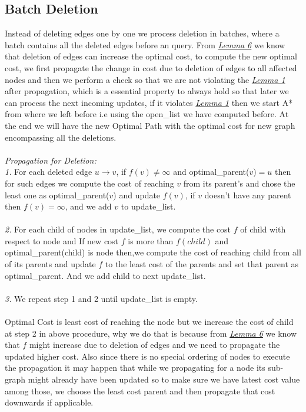 \documentclass[a4paper]{article}
\begin{document}
\subsection{Batch Deletion}
Instead of deleting edges one by one we process deletion in batches, where a batch contains all the deleted edges before an query. From \hyperlink{Lemma 6}{\textit{Lemma 6}} we know that deletion of edges can increase the optimal cost, to compute the new optimal cost, we first propagate the change in cost due to deletion of edges to all affected nodes and then we perform a check so that we  are not violating the \hyperlink{Lemma 1}{\textit{Lemma 1}} after propagation, which is a essential property to always hold so that later we can process the next incoming updates, if it violates \hyperlink{Lemma 1}{\textit{Lemma 1}} then we start A* from where we left before i.e using the open\_list we have computed before. At the end we will have the new Optimal Path with the optimal cost for new graph encompassing all the deletions.\\
\\
\textit{Propagation for Deletion:}\\
\textit{1.} For each deleted edge $u \rightarrow v$, if $f(v) \neq \infty$ and optimal\_parent($v$)$=u$ then for such edges we compute the cost of reaching $v$ from its parent's and chose the least one as optimal\_parent($v$) and update $f(v)$, if $v$ doesn't have any parent then $f(v)=\infty$, and we add $v$ to update\_list.\\
\\\textit{2.} For each child of nodes in update\_list, we compute the cost $f$ of child with respect to node and If new cost $f$ is more than $f(child)$ and optimal\_parent(child)  is node
     then,we compute the cost of reaching child from all of its parents and update $f$ to the least cost of the parents and set that parent as optimal\_parent. And we add child to next update\_list.\\
 \\  
\textit{3.} We repeat step 1 and 2 until update\_list is empty.\\
\\
Optimal Cost is least cost of reaching the node but we increase the cost of child at step 2 in above procedure, why we do that is because from \hyperlink{Lemma 6}{\textit{Lemma 6}} we know that $f$ might increase due to deletion of edges and we need to propagate the updated higher cost. Also since there is no special ordering of nodes to execute the propagation it may happen that while we propagating for a node its sub-graph might already have been updated so to make sure we have latest cost value among those, we choose the least cost parent and then propagate that cost downwards if applicable.\\ 
\end{document}
